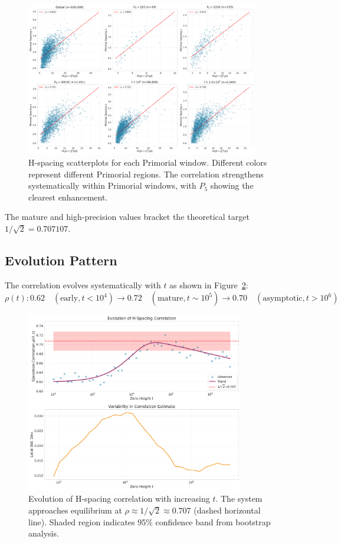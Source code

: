 \documentclass[12pt]{article}
\begin{document}
\begin{figure}[htbp]
\centering
\includegraphics[width=0.9\textwidth]{fig_s2_h_spacing_scatter.pdf}
\caption{H-spacing scatterplots for each Primorial window. Different colors represent different Primorial regions. The correlation strengthens systematically within Primorial windows, with $P_5$ showing the clearest enhancement.}
\label{fig:s2}
\end{figure}

The mature and high-precision values bracket the theoretical target
$1/\sqrt{2} = 0.707107$.

\subsection{Evolution Pattern}

The correlation evolves systematically with $t$ as shown in Figure~\ref{fig:s3}:
%
\begin{equation}
\rho(t)\colon 0.62 \quad (\text{early}, t < 10^4) \to 0.72 \quad (\text{mature}, t \sim 10^5) \to 0.70 \quad (\text{asymptotic}, t > 10^6)
\end{equation}

\begin{figure}[htbp]
\centering
\includegraphics[width=0.85\textwidth]{fig_s3_correlation_evolution.pdf}
\caption{Evolution of H-spacing correlation with increasing $t$. The system approaches equilibrium at $\rho \approx 1/\sqrt{2} \approx 0.707$ (dashed horizontal line). Shaded region indicates 95\% confidence band from bootstrap analysis.}
\label{fig:s3}
\end{figure}
\end{document}
